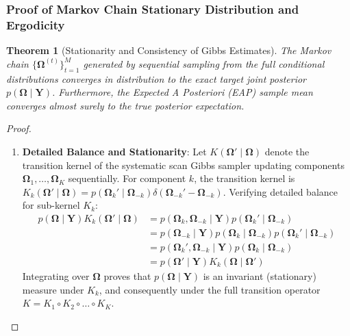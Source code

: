 \documentclass[11pt,a4paper]{article}
\newtheorem{theorem}{Theorem}
\begin{document}
\subsubsection{Proof of Markov Chain Stationary Distribution and Ergodicity}

\begin{theorem}[Stationarity and Consistency of Gibbs Estimates]
The Markov chain $\{\boldsymbol{\Omega}^{(t)}\}_{t=1}^M$ generated by sequential sampling from the full conditional distributions converges in distribution to the exact target joint posterior $p(\boldsymbol{\Omega} \mid \mathbf{Y})$. Furthermore, the Expected A Posteriori (EAP) sample mean converges almost surely to the true posterior expectation.
\end{theorem}

\begin{proof}

\begin{enumerate}
    \item \textbf{Detailed Balance and Stationarity}:
    Let $K(\boldsymbol{\Omega}' \mid \boldsymbol{\Omega})$ denote the transition kernel of the systematic scan Gibbs sampler updating components $\boldsymbol{\Omega}_1, \dots, \boldsymbol{\Omega}_K$ sequentially. For component $k$, the transition kernel is $K_k(\boldsymbol{\Omega}' \mid \boldsymbol{\Omega}) = p(\boldsymbol{\Omega}_k' \mid \boldsymbol{\Omega}_{-k}) \delta(\boldsymbol{\Omega}_{-k}' - \boldsymbol{\Omega}_{-k})$.
    Verifying detailed balance for sub-kernel $K_k$:
    \begin{align}
    p(\boldsymbol{\Omega} \mid \mathbf{Y}) K_k(\boldsymbol{\Omega}' \mid \boldsymbol{\Omega}) &= p(\boldsymbol{\Omega}_k, \boldsymbol{\Omega}_{-k} \mid \mathbf{Y}) p(\boldsymbol{\Omega}_k' \mid \boldsymbol{\Omega}_{-k}) \\
    &= p(\boldsymbol{\Omega}_{-k} \mid \mathbf{Y}) p(\boldsymbol{\Omega}_k \mid \boldsymbol{\Omega}_{-k}) p(\boldsymbol{\Omega}_k' \mid \boldsymbol{\Omega}_{-k}) \\
    &= p(\boldsymbol{\Omega}_k', \boldsymbol{\Omega}_{-k} \mid \mathbf{Y}) p(\boldsymbol{\Omega}_k \mid \boldsymbol{\Omega}_{-k}) \\
    &= p(\boldsymbol{\Omega}' \mid \mathbf{Y}) K_k(\boldsymbol{\Omega} \mid \boldsymbol{\Omega}')
    \end{align}
    Integrating over $\boldsymbol{\Omega}$ proves that $p(\boldsymbol{\Omega} \mid \mathbf{Y})$ is an invariant (stationary) measure under $K_k$, and consequently under the full transition operator $K = K_1 \circ K_2 \circ \dots \circ K_K$.


\end{enumerate}
\end{proof}
\end{document}
